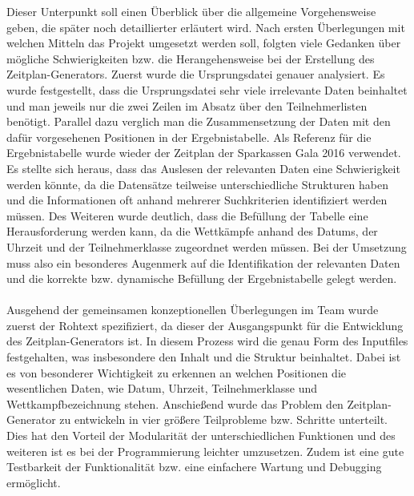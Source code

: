 {Dieser Unterpunkt soll einen Überblick über die allgemeine Vorgehensweise geben, die später noch detaillierter erläutert wird. Nach ersten Überlegungen mit welchen Mitteln das Projekt umgesetzt werden soll, folgten viele Gedanken über mögliche Schwierigkeiten bzw. die Herangehensweise bei der Erstellung des Zeitplan-Generators. Zuerst wurde die Ursprungsdatei genauer analysiert. Es wurde festgestellt, dass die Ursprungsdatei sehr viele irrelevante Daten beinhaltet und man jeweils nur die zwei Zeilen im Absatz über den Teilnehmerlisten benötigt. Parallel dazu verglich man die Zusammensetzung der Daten mit den dafür vorgesehenen Positionen in der Ergebnistabelle. Als Referenz für die Ergebnistabelle wurde wieder der Zeitplan der Sparkassen Gala 2016 verwendet. Es stellte sich heraus, dass das Auslesen der relevanten Daten eine Schwierigkeit werden könnte, da die Datensätze teilweise unterschiedliche Strukturen haben und die Informationen oft anhand mehrerer Suchkriterien identifiziert werden müssen. Des Weiteren wurde deutlich, dass die Befüllung der Tabelle eine Herausforderung werden kann, da die Wettkämpfe anhand des Datums, der Uhrzeit und der Teilnehmerklasse zugeordnet werden müssen. Bei der Umsetzung muss also ein besonderes Augenmerk auf die Identifikation der relevanten Daten und die korrekte bzw. dynamische Befüllung der Ergebnistabelle gelegt werden. \\
\\
Ausgehend der gemeinsamen konzeptionellen Überlegungen im Team wurde zuerst der Rohtext spezifiziert, da dieser der Ausgangspunkt für die Entwicklung des Zeitplan-Generators ist. In diesem Prozess wird die genau Form des Inputfiles festgehalten, was insbesondere den Inhalt und die Struktur beinhaltet. Dabei ist es von besonderer Wichtigkeit zu erkennen an welchen Positionen die wesentlichen Daten, wie Datum, Uhrzeit, Teilnehmerklasse und Wettkampfbezeichnung stehen. 
Anschießend wurde das Problem den Zeitplan-Generator zu entwickeln in vier größere Teilprobleme bzw. Schritte unterteilt. Dies hat den Vorteil der Modularität der unterschiedlichen Funktionen und des weiteren ist es bei der Programmierung leichter umzusetzen. Zudem ist eine gute Testbarkeit der Funktionalität bzw. eine einfachere Wartung  und Debugging ermöglicht. 
}

